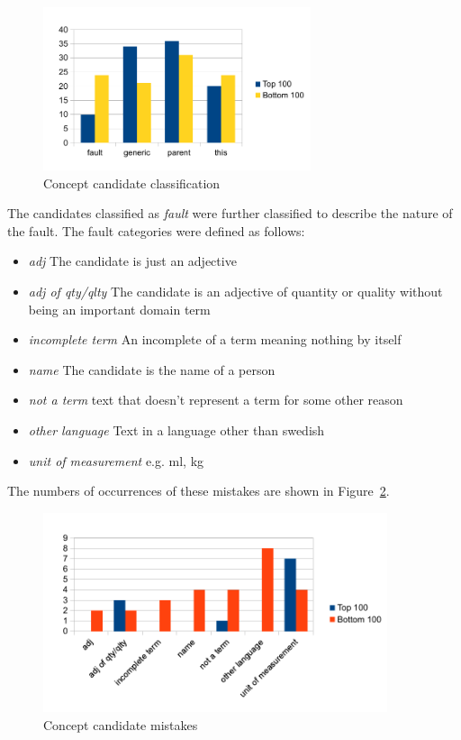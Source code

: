 \documentclass[a4paper]{report}
\begin{document}
\begin{figure}
  \centering
  \includegraphics[width=0.7\textwidth]{graphics/concepts}
  \caption{Concept candidate classification}
  \label{fig:concept-cands}
\end{figure}

The candidates classified as \emph{fault} were further classified to describe the nature of the fault.
The fault categories were defined as follows:
\begin{itemize}
  \item \emph{adj} The candidate is just an adjective
  \item \emph{adj of qty/qlty} The candidate is an adjective of quantity or quality without being an important domain term
  \item \emph{incomplete term} An incomplete of a term meaning nothing by itself
  \item \emph{name} The candidate is the name of a person
  \item \emph{not a term} text that doesn't represent a term for some other reason
  \item \emph{other language} Text in a language other than swedish
  \item \emph{unit of measurement} e.g. ml, kg
\end{itemize}
The numbers of occurrences of these mistakes are shown in Figure~\ref{fig:concept-cand-mistakes}.

\begin{figure}
  \centering
  \includegraphics[width=0.9\textwidth]{graphics/concepts-mistakes}
  \caption{Concept candidate mistakes}
  \label{fig:concept-cand-mistakes}
\end{figure}
\end{document}

